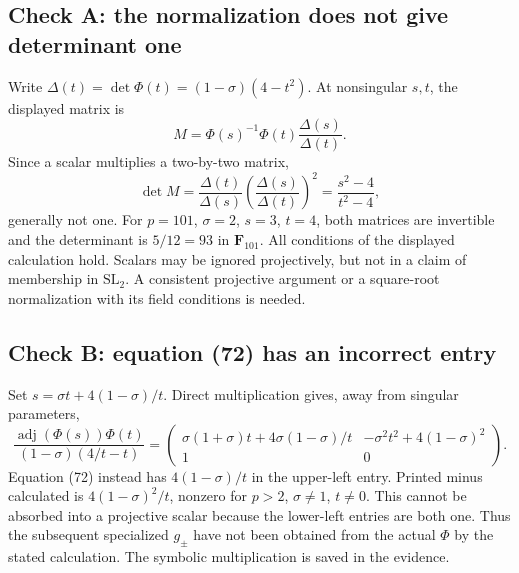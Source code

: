 \documentclass[10pt]{article}
\begin{document}
\subsection*{Check A: the normalization does not give determinant one}
Write \(\Delta(t)=\det\Phi(t)=(1-\sigma)(4-t^2)\). At nonsingular \(s,t\), the displayed matrix is \[M=\Phi(s)^{-1}\Phi(t)\frac{\Delta(s)}{\Delta(t)}.\] Since a scalar multiplies a two-by-two matrix, \[\det M=\frac{\Delta(t)}{\Delta(s)}
 \left(\frac{\Delta(s)}{\Delta(t)}\right)^2
 =\frac{s^2-4}{t^2-4},\] generally not one. For \(p=101\), \(\sigma=2\), \(s=3\), \(t=4\), both matrices are invertible and the determinant is \(5/12=93\) in \(\mathbf F_{101}\). All conditions of the displayed calculation hold. Scalars may be ignored projectively, but not in a claim of membership in \(\mathrm{SL}_2\). A consistent projective argument or a square-root normalization with its field conditions is needed.\par
\subsection*{Check B: equation (72) has an incorrect entry}
Set \(s=\sigma t+4(1-\sigma)/t\). Direct multiplication gives, away from singular parameters, \[\frac{\operatorname{adj}(\Phi(s))\Phi(t)}
 {(1-\sigma)(4/t-t)}
 =
 \begin{pmatrix}
 \sigma(1+\sigma)t+4\sigma(1-\sigma)/t&
 -\sigma^2t^2+4(1-\sigma)^2\\
 1&0
 \end{pmatrix}.\] Equation (72) instead has \(4(1-\sigma)/t\) in the upper-left entry. Printed minus calculated is \(4(1-\sigma)^2/t\), nonzero for \(p>2\), \(\sigma\ne1\), \(t\ne0\). This cannot be absorbed into a projective scalar because the lower-left entries are both one. Thus the subsequent specialized \(g_\pm\) have not been obtained from the actual \(\Phi\) by the stated calculation. The symbolic multiplication is saved in the evidence.\par
\end{document}
